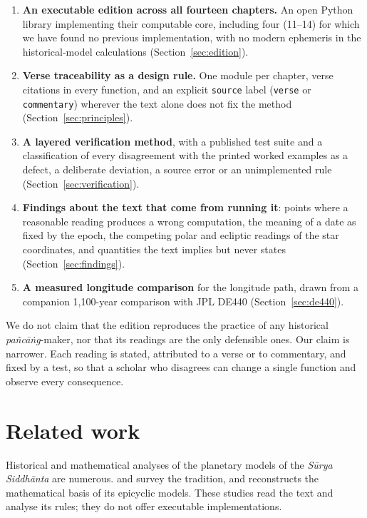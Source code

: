 \documentclass[11pt,a4paper]{article}
\newcommand{\SuSi}{\textit{S\=urya Siddh\=anta}}
\begin{document}
\begin{enumerate}
  \item[\textbf{C1}] \textbf{An executable edition across all fourteen chapters.} An open Python library implementing their computable core, including four (11--14) for which we have found no previous implementation, with no modern ephemeris in the historical-model calculations (Section~\ref{sec:edition}).
  \item[\textbf{C2}] \textbf{Verse traceability as a design rule.} One module per chapter, verse citations in every function, and an explicit \texttt{source} label (\texttt{verse} or \texttt{commentary}) wherever the text alone does not fix the method (Section~\ref{sec:principles}).
  \item[\textbf{C3}] \textbf{A layered verification method}, with a published test suite and a classification of every disagreement with the printed worked examples as a defect, a deliberate deviation, a source error or an unimplemented rule (Section~\ref{sec:verification}).
  \item[\textbf{C4}] \textbf{Findings about the text that come from running it}: points where a reasonable reading produces a wrong computation, the meaning of a date as fixed by the epoch, the competing polar and ecliptic readings of the star coordinates, and quantities the text implies but never states (Section~\ref{sec:findings}).
  \item[\textbf{C5}] \textbf{A measured longitude comparison} for the longitude path, drawn from a companion 1,100-year comparison with JPL DE440 (Section~\ref{sec:de440}).
\end{enumerate}

We do not claim that the edition reproduces the practice of any historical \textit{pa\~nc\=a\.ng}-maker, nor that its readings are the only defensible ones. Our claim is narrower. Each reading is stated, attributed to a verse or to commentary, and fixed by a test, so that a scholar who disagrees can change a single function and observe every consequence.

\section{Related work}
\label{sec:related}

Historical and mathematical analyses of the planetary models of the \SuSi{} are numerous. \citet{pingree1978} and \citet{plofker2009} survey the tradition, and \citet{duke2005} reconstructs the mathematical basis of its epicyclic models. These studies read the text and analyse its rules; they do not offer executable implementations.
\end{document}
